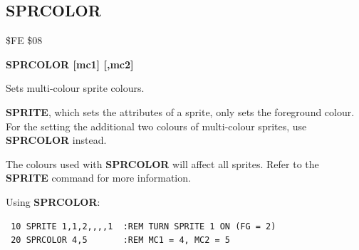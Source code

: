 \subsection{SPRCOLOR}
\begin{description}[leftmargin=2cm,style=nextline]
\item [Token:] \$FE \$08
\item [Format:] {\bf SPRCOLOR [mc1] [,mc2]}
\item [Usage:]  Sets multi-colour sprite colours.

                {\bf SPRITE}, which sets the
                attributes of a sprite, only sets the foreground
                colour. For the setting the additional two colours
                of multi-colour sprites, use {\bf SPRCOLOR} instead.

\item [Remarks:] The colours used with {\bf SPRCOLOR} will affect all sprites.
                 Refer to the {\bf SPRITE} command for more information.

\item [Example:] Using {\bf SPRCOLOR}:
\begin{tcolorbox}[colback=black,coltext=white]
\verbatimfont{\codefont}
\begin{verbatim}
 10 SPRITE 1,1,2,,,,1  :REM TURN SPRITE 1 ON (FG = 2)
 20 SPRCOLOR 4,5       :REM MC1 = 4, MC2 = 5
\end{verbatim}
\end{tcolorbox}
\end{description}


\newpage
